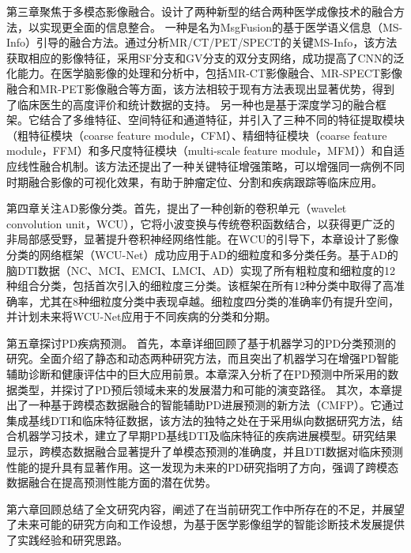 第三章聚焦于多模态影像融合。设计了两种新型的结合两种医学成像技术的融合方法，以实现更全面的信息整合。
一种是名为MsgFusion的基于医学语义信息（MS-Info）引导的融合方法。通过分析MR/CT/PET/SPECT的关键MS-Info，该方法获取相应的影像特征，采用SF分支和GV分支的双分支网络，成功提高了CNN的泛化能力。在医学脑影像的处理和分析中，包括MR-CT影像融合、MR-SPECT影像融合和MR-PET影像融合等方面，该方法相较于现有方法表现出显著优势，得到了临床医生的高度评价和统计数据的支持。
另一种也是基于深度学习的融合框架。它结合了多维特征、空间特征和通道特征，并引入了三种不同的特征提取模块（粗特征模块（coarse feature module，CFM）、精细特征模块（coarse feature module，FFM）和多尺度特征模块（multi-scale feature module，MFM））和自适应线性融合机制。该方法还提出了一种关键特征增强策略，可以增强同一病例不同时期融合影像的可视化效果，有助于肿瘤定位、分割和疾病跟踪等临床应用。


第四章关注AD影像分类。首先，提出了一种创新的卷积单元（wavelet convolution unit，WCU），它将小波变换与传统卷积函数结合，以获得更广泛的非局部感受野，显著提升卷积神经网络性能。在WCU的引导下，本章设计了影像分类的网络框架（WCU-Net）成功应用于AD的细粒度和多分类任务。基于AD的脑DTI数据（NC、MCI、EMCI、LMCI、AD）实现了所有粗粒度和细粒度的12种组合分类，包括首次引入的细粒度三分类。该框架在所有12种分类中取得了高准确率，尤其在8种细粒度分类中表现卓越。细粒度四分类的准确率仍有提升空间，并计划未来将WCU-Net应用于不同疾病的分类和分期。


第五章探讨PD疾病预测。
首先，本章详细回顾了基于机器学习的PD分类预测的研究。全面介绍了静态和动态两种研究方法，而且突出了机器学习在增强PD智能辅助诊断和健康评估中的巨大应用前景。本章深入分析了在PD预测中所采用的数据类型，并探讨了PD预后领域未来的发展潜力和可能的演变路径。
其次，本章提出了一种基于跨模态数据融合的智能辅助PD进展预测的新方法（CMFP）。它通过集成基线DTI和临床特征数据，该方法的独特之处在于采用纵向数据研究方法，结合机器学习技术，建立了早期PD基线DTI及临床特征的疾病进展模型。研究结果显示，跨模态数据融合显著提升了单模态预测的准确度，并且DTI数据对临床预测性能的提升具有显著作用。这一发现为未来的PD研究指明了方向，强调了跨模态数据融合在提高预测性能方面的潜在优势。

第六章回顾总结了全文研究内容，阐述了在当前研究工作中所存在的不足，并展望了未来可能的研究方向和工作设想，为基于医学影像组学的智能诊断技术发展提供了实践经验和研究思路。